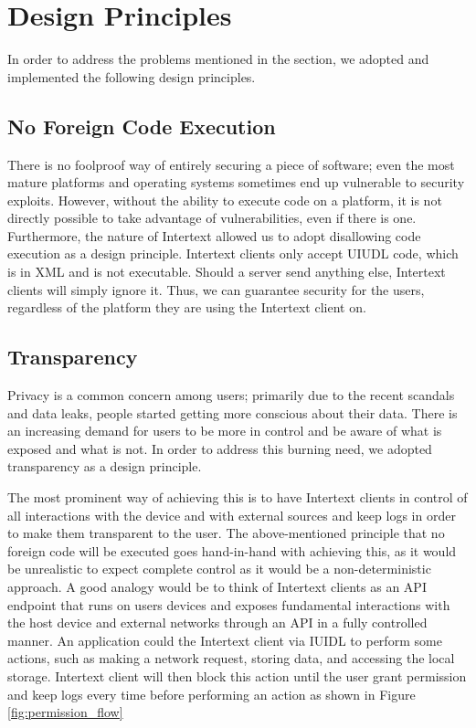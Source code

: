 
\section{Design Principles} \label{designPrinciples}

In order to address the problems mentioned in the  section, we adopted and implemented the following design principles.

\subsection{No Foreign Code Execution}

There is no foolproof way of entirely securing a piece of software; even the most mature platforms and operating systems sometimes end up vulnerable to security exploits. However, without the ability to execute code on a platform, it is not directly possible to take advantage of vulnerabilities, even if there is one. Furthermore, the nature of Intertext allowed us to adopt disallowing code execution as a design principle. Intertext clients only accept UIUDL code, which is in XML and is not executable. Should a server send anything else, Intertext clients will simply ignore it. Thus, we can guarantee security for the users, regardless of the platform they are using the Intertext client on.

\subsection{Transparency}

Privacy is a common concern among users; primarily due to the recent scandals and data leaks, people started getting more conscious about their data. There is an increasing demand for users to be more in control and be aware of what is exposed and what is not. In order to address this burning need, we adopted transparency as a design principle. 

The most prominent way of achieving this is to have Intertext clients in control of all interactions with the device and with external sources and keep logs in order to make them transparent to the user. The above-mentioned principle that no foreign code will be executed goes hand-in-hand with achieving this, as it would be unrealistic to expect complete control as it would be a non-deterministic approach. A good analogy would be to think of Intertext clients as an API endpoint that runs on users devices and exposes fundamental interactions with the host device and external networks through an API in a fully controlled manner. An application could  the Intertext client via IUIDL to perform some actions, such as making a network request, storing data, and accessing the local storage. Intertext client will then block this action until the user grant permission and keep logs every time before performing an action as shown in Figure \ref{fig:permission_flow}

